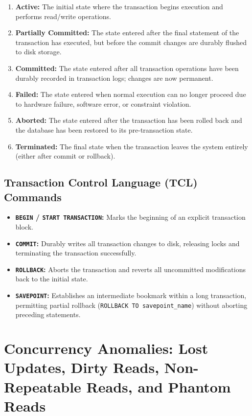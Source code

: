 \begin{enumerate}
\item \textbf{Active:} The initial state where the transaction begins execution and performs read/write operations.
\item \textbf{Partially Committed:} The state entered after the final statement of the transaction has executed, but before the commit changes are durably flushed to disk storage.
\item \textbf{Committed:} The state entered after all transaction operations have been durably recorded in transaction logs; changes are now permanent.
\item \textbf{Failed:} The state entered when normal execution can no longer proceed due to hardware failure, software error, or constraint violation.
\item \textbf{Aborted:} The state entered after the transaction has been rolled back and the database has been restored to its pre-transaction state.
\item \textbf{Terminated:} The final state when the transaction leaves the system entirely (either after commit or rollback).
\end{enumerate}

\subsection{Transaction Control Language (TCL) Commands}

\begin{itemize}
\item \textbf{\texttt{BEGIN} / \texttt{START TRANSACTION}:} Marks the beginning of an explicit transaction block.
\item \textbf{\texttt{COMMIT}:} Durably writes all transaction changes to disk, releasing locks and terminating the transaction successfully.
\item \textbf{\texttt{ROLLBACK}:} Aborts the transaction and reverts all uncommitted modifications back to the initial state.
\item \textbf{\texttt{SAVEPOINT}:} Establishes an intermediate bookmark within a long transaction, permitting partial rollback (\texttt{ROLLBACK TO savepoint\_name}) without aborting preceding statements.
\end{itemize}

\newpage
\section{Concurrency Anomalies: Lost Updates, Dirty Reads, Non-Repeatable Reads, and Phantom Reads}

